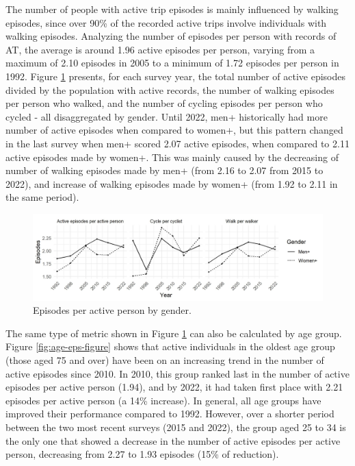 \documentclass[preprint, 3p,
authoryear]{elsarticle} %
\begin{document}
The number of people with active trip episodes is mainly influenced by
walking episodes, since over 90\% of the recorded active trips involve
individuals with walking episodes. Analyzing the number of episodes per
person with records of AT, the average is around 1.96 active episodes
per person, varying from a maximum of 2.10 episodes in 2005 to a minimum
of 1.72 episodes per person in 1992. Figure \ref{fig:gender-eps-figure}
presents, for each survey year, the total number of active episodes
divided by the population with active records, the number of walking
episodes per person who walked, and the number of cycling episodes per
person who cycled - all disaggregated by gender. Until 2022, men+
historically had more number of active episodes when compared to women+,
but this pattern changed in the last survey when men+ scored 2.07 active
episodes, when compared to 2.11 active episodes made by women+. This was
mainly caused by the decreasing of number of walking episodes made by
men+ (from 2.16 to 2.07 from 2015 to 2022), and increase of walking
episodes made by women+ (from 1.92 to 2.11 in the same period).

\begin{figure}
\includegraphics[width=1\linewidth]{figures/eps_gender_graph} \caption{Episodes per active person by gender.}\label{fig:gender-eps-figure}
\end{figure}

The same type of metric shown in Figure \ref{fig:gender-eps-figure} can
also be calculated by age group. Figure \ref{fig:age-eps-figure} shows
that active individuals in the oldest age group (those aged 75 and over)
have been on an increasing trend in the number of active episodes since
2010. In 2010, this group ranked last in the number of active episodes
per active person (1.94), and by 2022, it had taken first place with
2.21 episodes per active person (a 14\% increase). In general, all age
groups have improved their performance compared to 1992. However, over a
shorter period between the two most recent surveys (2015 and 2022), the
group aged 25 to 34 is the only one that showed a decrease in the number
of active episodes per active person, decreasing from 2.27 to 1.93
episodes (15\% of reduction).
\end{document}
